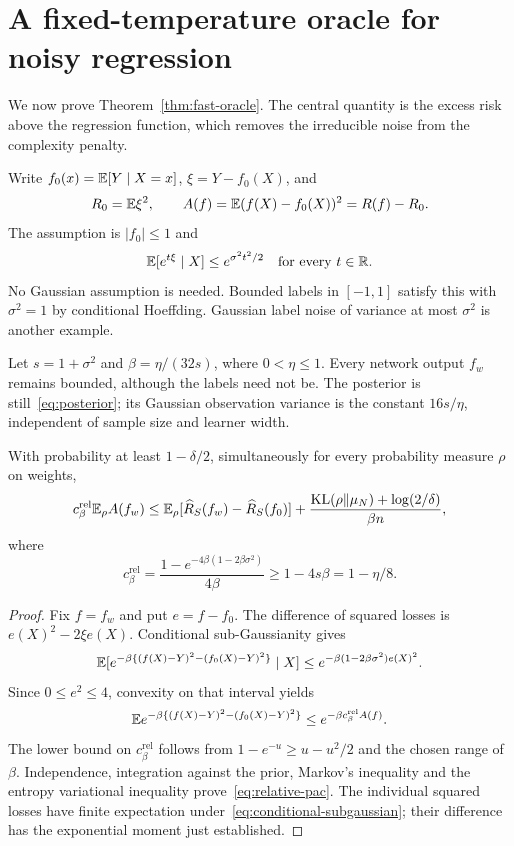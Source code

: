 \section{A fixed-temperature oracle for noisy regression}
\label{sec:noisy-regression}
We now prove Theorem~\ref{thm:fast-oracle}. The central quantity is the excess risk above the regression function, which removes the irreducible noise from the complexity penalty.

Write $f_0(x)=\mathbb E[Y\mid X=x]$, $\xi=Y-f_0(X)$, and
\[
 R_0=\mathbb E\xi^2,\qquad
 A(f)=\mathbb E(f(X)-f_0(X))^2=R(f)-R_0.
\]
The assumption is $|f_0|\le1$ and
\begin{equation}
 \mathbb E[e^{t\xi}\mid X]\le e^{\sigma^2t^2/2}
 \quad\text{for every }t\in\mathbb R.
 \label{eq:conditional-subgaussian}
\end{equation}
No Gaussian assumption is needed. Bounded labels in $[-1,1]$ satisfy this with $\sigma^2=1$ by conditional Hoeffding. Gaussian label noise of variance at most $\sigma^2$ is another example.

Let $s=1+\sigma^2$ and $\beta=\eta/(32s)$, where $0<\eta\le1$. Every network output $f_w$ remains bounded, although the labels need not be. The posterior is still~\eqref{eq:posterior}; its Gaussian observation variance is the constant $16s/\eta$, independent of sample size and learner width.

\begin{lemma}\label{lem:relative-pac}
With probability at least $1-\delta/2$, simultaneously for every probability measure $\rho$ on weights,
\begin{equation}
 c_\beta^{\mathrm{rel}}\mathbb E_\rho A(f_w)
 \le\mathbb E_\rho[\widehat R_S(f_w)-\widehat R_S(f_0)]
       +\frac{\operatorname{KL}(\rho\|\mu_N)+\log(2/\delta)}{\beta n},
 \label{eq:relative-pac}
\end{equation}
where
\[
 c_\beta^{\mathrm{rel}}=\frac{1-e^{-4\beta(1-2\beta\sigma^2)}}{4\beta}
       \ge1-4s\beta=1-\eta/8.
\]
\end{lemma}
\begin{proof}
Fix $f=f_w$ and put $e=f-f_0$. The difference of squared losses is $e(X)^2-2\xi e(X)$. Conditional sub-Gaussianity gives
\[
 \mathbb E[e^{-\beta\{(f(X)-Y)^2-(f_0(X)-Y)^2\}}\mid X]
 \le e^{-\beta(1-2\beta\sigma^2)e(X)^2}.
\]
Since $0\le e^2\le4$, convexity on that interval yields
\[
 \mathbb E e^{-\beta\{(f(X)-Y)^2-(f_0(X)-Y)^2\}}
 \le e^{-\beta c_\beta^{\mathrm{rel}} A(f)}.
\]
The lower bound on $c_\beta^{\mathrm{rel}}$ follows from $1-e^{-u}\ge u-u^2/2$ and the chosen range of $\beta$. Independence, integration against the prior, Markov's inequality and the entropy variational inequality prove~\eqref{eq:relative-pac}. The individual squared losses have finite expectation under~\eqref{eq:conditional-subgaussian}; their difference has the exponential moment just established.
\end{proof}


